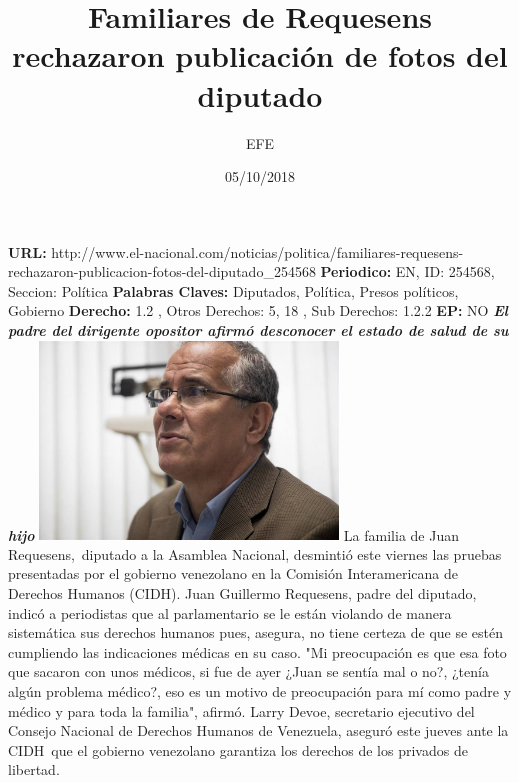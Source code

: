 \documentclass{article}%
\title{\textbf{Familiares de Requesens rechazaron publicación de fotos del diputado}}%
\author{EFE}%
\date{05/10/2018}%
\begin{document}
%
\normalsize%
\maketitle%
\textbf{URL: }%
http://www.el{-}nacional.com/noticias/politica/familiares{-}requesens{-}rechazaron{-}publicacion{-}fotos{-}del{-}diputado\_254568\newline%
%
\textbf{Periodico: }%
EN, %
ID: %
254568, %
Seccion: %
Política\newline%
%
\textbf{Palabras Claves: }%
Diputados, Política, Presos políticos, Gobierno\newline%
%
\textbf{Derecho: }%
1.2%
, Otros Derechos: %
5, 18%
, Sub Derechos: %
1.2.2%
\newline%
%
\textbf{EP: }%
NO\newline%
\newline%
%
\textbf{\textit{El padre del dirigente opositor afirmó desconocer el estado de salud de su hijo}}%
\newline%
\newline%
%
\includegraphics[width=300px]{164.jpg}%
\newline%
%
La familia de Juan Requesens,~diputado a la Asamblea Nacional, desmintió este viernes las pruebas presentadas por el gobierno venezolano en la Comisión Interamericana de Derechos Humanos (CIDH).%
\newline%
%
Juan Guillermo Requesens, padre del diputado, indicó a periodistas que al parlamentario se le están violando de manera sistemática sus derechos humanos pues, asegura, no tiene certeza de que se estén cumpliendo las indicaciones médicas en su caso.%
\newline%
%
"Mi preocupación es que esa foto que sacaron con unos médicos, si fue de ayer ¿Juan se sentía mal o no?, ¿tenía algún problema médico?, eso es un motivo de preocupación para mí como padre y médico y para toda la familia", afirmó.%
\newline%
%
Larry Devoe, secretario ejecutivo del Consejo Nacional de Derechos Humanos de Venezuela, aseguró este jueves ante la CIDH~que el gobierno venezolano garantiza los derechos de los privados de libertad.%
\end{document}
